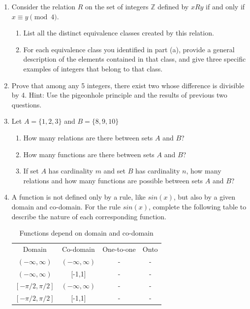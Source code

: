 \documentclass{article}
\begin{document}
\begin{enumerate}
    \newpage
    
    \item  Consider the relation $R$ on the set of integers $\mathbb{Z}$ defined by $xRy$ if and only if $x \equiv y \pmod{4}$.
        \begin{enumerate}
            \item List all the distinct equivalence classes created by this relation.
            \item For each equivalence class you identified in part (a), provide a general description of the elements contained in that class, and give three specific examples of integers that belong to that class.
        \end{enumerate} 

    \item Prove that among any 5 integers, there exist two whose difference is divisible by 4.  Hint: Use the pigeonhole principle and the results of previous two questions.
    
    \item Let \(A=\{1,2,3\}\) and \(B=\{8,9,10\}\)
        \begin{enumerate}
            \item How many relations are there between sets $A$ and $B$?
            \item How many functions are there between sets $A$ and $B$?
            \item If set $A$ has cardinality $m$ and set $B$ has cardinality $n$, how many relations and how many functions are possible between sets $A$ and $B$?
        \end{enumerate}

        
    \item  A function is not defined only by a rule, like $sin(x)$, but also by a given domain and co-domain. For the rule $sin(x)$, complete the following table to describe the nature of each corresponding function. 
\begin{table}[H]
    \centering
    \begin{tabular}{cccc}
       Domain  & Co-domain & One-to-one  & Onto  \\
      $(-\infty,\infty)$ & $(-\infty,\infty)$ & - & -\\
      $(-\infty,\infty)$ & [-1,1] & - & - \\
      $[-\pi/2,\pi/2]$  & $(-\infty,\infty)$ & - & - \\
      $[-\pi/2,\pi/2]$  & [-1,1] & - & - \\
    \end{tabular}
    \caption{Functions depend on domain and co-domain}
    \label{tab:my_label}
\end{table}
  
\end{enumerate}
\end{document}
